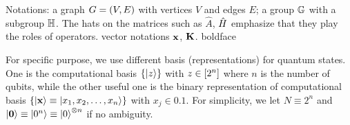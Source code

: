 Notations: a graph $G=(V,E)$ with vertices $V$ and edges $E$; a group $\mathbb{G}$ with a subgroup $\mathbb{H}$. 
The hats on the matrices such as $\hat{A}$, $\hat{H}$ emphasize that they play the roles of operators.
vector notations $\vb{x}$, $\vb{K}$. boldface

For specific purpose, we use different basis (representations) for quantum states.
One is the computational basis $\qty{\ket{z}}$ with $z\in \qty[2^n]$ where $n$ is the number of qubits,
while the other useful one is the binary representation of computational basis $\qty{\ket{\vb{x}}\equiv\ket{x_1,x_2,\dots,x_n}}$ with $x_j\in \qty{0,1}$. 
For simplicity, we let $N \equiv 2^n$ and $\ket{\vb{0}}\equiv\ket{0^n} \equiv\ket{0}^{\otimes n}$ if no ambiguity.


